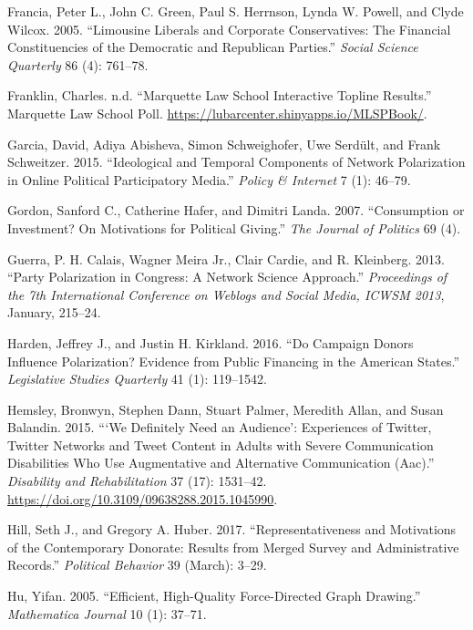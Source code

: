 \documentclass[12pt,]{article}
\begin{document}
\leavevmode\hypertarget{ref-francia2005}{}%
Francia, Peter L., John C. Green, Paul S. Herrnson, Lynda W. Powell, and
Clyde Wilcox. 2005. ``Limousine Liberals and Corporate Conservatives:
The Financial Constituencies of the Democratic and Republican Parties.''
\emph{Social Science Quarterly} 86 (4): 761--78.

\leavevmode\hypertarget{ref-mlsp}{}%
Franklin, Charles. n.d. ``Marquette Law School Interactive Topline
Results.'' Marquette Law School Poll.
\url{https://lubarcenter.shinyapps.io/MLSPBook/}.

\leavevmode\hypertarget{ref-garcia2015}{}%
Garcia, David, Adiya Abisheva, Simon Schweighofer, Uwe Serdült, and
Frank Schweitzer. 2015. ``Ideological and Temporal Components of Network
Polarization in Online Political Participatory Media.'' \emph{Policy \&
Internet} 7 (1): 46--79.

\leavevmode\hypertarget{ref-gordon2007}{}%
Gordon, Sanford C., Catherine Hafer, and Dimitri Landa. 2007.
``Consumption or Investment? On Motivations for Political Giving.''
\emph{The Journal of Politics} 69 (4).

\leavevmode\hypertarget{ref-guerra2013}{}%
Guerra, P. H. Calais, Wagner Meira Jr., Clair Cardie, and R. Kleinberg.
2013. ``Party Polarization in Congress: A Network Science Approach.''
\emph{Proceedings of the 7th International Conference on Weblogs and
Social Media, ICWSM 2013}, January, 215--24.

\leavevmode\hypertarget{ref-harden2016}{}%
Harden, Jeffrey J., and Justin H. Kirkland. 2016. ``Do Campaign Donors
Influence Polarization? Evidence from Public Financing in the American
States.'' \emph{Legislative Studies Quarterly} 41 (1): 119--1542.

\leavevmode\hypertarget{ref-hemsley2015}{}%
Hemsley, Bronwyn, Stephen Dann, Stuart Palmer, Meredith Allan, and Susan
Balandin. 2015. ```We Definitely Need an Audience': Experiences of
Twitter, Twitter Networks and Tweet Content in Adults with Severe
Communication Disabilities Who Use Augmentative and Alternative
Communication (Aac).'' \emph{Disability and Rehabilitation} 37 (17):
1531--42. \url{https://doi.org/10.3109/09638288.2015.1045990}.

\leavevmode\hypertarget{ref-hill2017}{}%
Hill, Seth J., and Gregory A. Huber. 2017. ``Representativeness and
Motivations of the Contemporary Donorate: Results from Merged Survey and
Administrative Records.'' \emph{Political Behavior} 39 (March): 3--29.

\leavevmode\hypertarget{ref-yifanhu}{}%
Hu, Yifan. 2005. ``Efficient, High-Quality Force-Directed Graph
Drawing.'' \emph{Mathematica Journal} 10 (1): 37--71.
\end{document}
